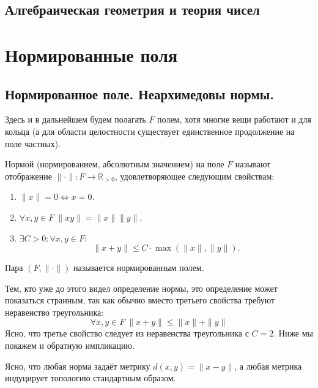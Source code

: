 \documentclass[11pt]{article}
\begin{document}
    
    \begin{center}
        \section*{Алгебраическая геометрия и теория чисел}
    \end{center}
    \tableofcontents
    \newpage

    \section{Нормированные поля}
    \subsection{Нормированное поле. Неархимедовы нормы.}
    Здесь и в дальнейшем будем полагать $F$ полем, хотя многие вещи работают и для кольца (а для области целостности существует
    единственное продолжение на поле частных).

    \begin{definition}\label{fieldnorm}
     Нормой (нормированием, абсолютным значением) на поле $F$  называют отображение $\| \cdot \|\colon F \to \mathbb{R}_{> 0}$,
        удовлетворяющее следующим свойствам:
        \begin{enumerate}
            \item $\| x \| = 0 \Leftrightarrow x = 0$.

            \item $\forall x, y \in F \ \| x y \| = \| x \| \| y \| $.

            \item $\exists C > 0\colon \forall x, y \in F\colon$
            \[ \| x + y \| \le C \cdot \max(\| x \|, \| y \| ). \]
        \end{enumerate}
        Пара $(F, \| \cdot \|)$ называется нормированным полем.
    \end{definition}
    \begin{remark}
        Тем, кто уже до этого видел определение нормы, это определение может показаться странным, так как обычно вместо третьего свойства
        требуют неравенство треугольника:
        \[ \forall x, y \in F \ \| x + y \| \le \| x \| + \| y \| \]
        Ясно, что третье свойство следует из неравенства треугольника с $C = 2$. Ниже мы покажем и обратную импликацию.
    \end{remark}

    Ясно, что любая норма задаёт метрику $d(x, y) = \| x - y \|$, а любая метрика индуцирует топологию стандартным образом.
\end{document}
